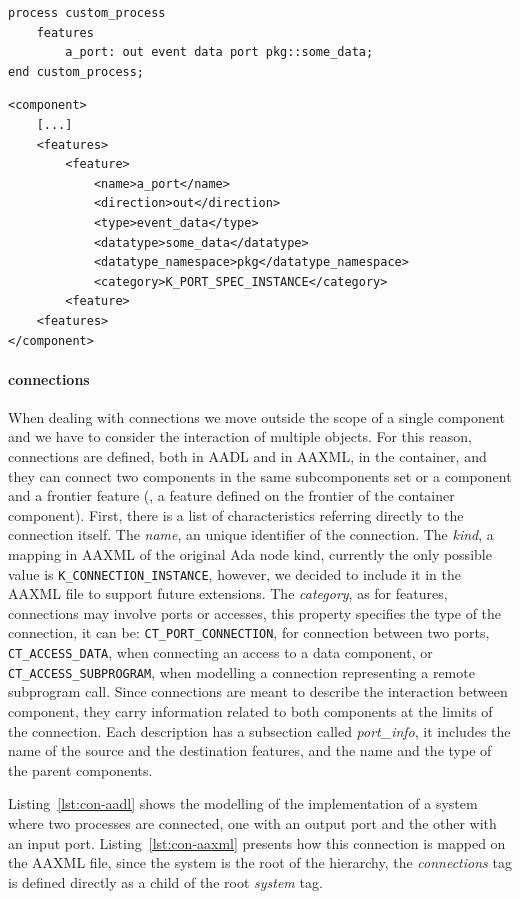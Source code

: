 \begin{lstlisting}[frame=tb,caption={TODO caption},label=lst:feature-aadl]
process custom_process
	features
		a_port: out event data port pkg::some_data;
end custom_process;
\end{lstlisting}

\begin{lstlisting}[frame=tb,caption={TODO caption},label=lst:feature-aaxml]
<component>
	[...]
	<features>
		<feature>
			<name>a_port</name>
			<direction>out</direction>
			<type>event_data</type>
			<datatype>some_data</datatype>
			<datatype_namespace>pkg</datatype_namespace>
			<category>K_PORT_SPEC_INSTANCE</category>
		<feature>
	<features>
</component>
\end{lstlisting}

\paragraph{connections} When dealing with connections we move outside the scope of a single component and we have to consider the interaction of multiple objects. For this reason, connections are defined, both in AADL and in AAXML, in the container, and they can connect two components in the same subcomponents set or a component and a frontier feature (\ie, a feature defined on the frontier of the container component). First, there is a list of characteristics referring directly to the connection itself. The \textit{name}, an unique identifier of the connection. The \textit{kind}, a mapping in AAXML of the original Ada node kind, currently the only possible value is \texttt{K\_CONNECTION\_INSTANCE}, however, we decided to include it in the AAXML file to support future extensions. The \textit{category}, as for features, connections may involve ports or accesses, this property specifies the type of the connection, it can be: \texttt{CT\_PORT\_CONNECTION}, for connection between two ports, \texttt{CT\_ACCESS\_DATA}, when connecting an access to a data component, or \texttt{CT\_ACCESS\_SUBPROGRAM}, when modelling a connection representing a remote subprogram call. Since connections are meant to describe the interaction between component, they carry information related to both components at the limits of the connection. Each description has a subsection called \textit{port\_info}, it includes the name of the source and the destination features, and the name and the type of the parent components.

Listing~\ref{lst:con-aadl} shows the modelling of the implementation of a system where two processes are connected, one with an output port and the other with an input port. Listing~\ref{lst:con-aaxml} presents how this connection is mapped on the AAXML file, since the system is the root of the hierarchy, the \textit{connections} tag is defined directly as a child of the root \textit{system} tag.

